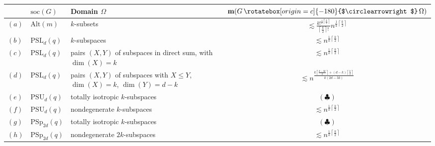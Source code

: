 \documentclass[a4paper]{amsart}
\newcommand{\m}{\mathbf{m}}
\newcommand{\act}{\,\rotatebox[origin=c]{-180}{$\circlearrowright$}\,}
\theoremstyle{definition}
\begin{document}
{\small
\begin{table}[th]
	\centering
	\begin{tabularx}{\textwidth}{l l X c}
		\toprule
		& $\mathrm{soc}(G)$ & Domain $\Omega$ & $\m(G \act \Omega)$ \\
		
		\midrule
        $(a)$ & $\mathrm{Alt}(m)$ & $k$-subsets & $\displaystyle
        \lesssim \frac{k!^{\frac{1}{k} \left\lceil \frac{k}{2}\right\rceil}}{\left\lceil \frac{k}{2}\right\rceil !} n^{\frac{1}{k} \left\lceil \frac{k}{2}\right\rceil}  $ \\
		
		$(b)$ & $\mathrm{PSL}_d(q)$ & $k$-subspaces & $\displaystyle
        \lesssim n^{\frac{1}{k} \left\lceil \frac{k}{2}\right\rceil}$  \\

        $(c)$ & $\mathrm{PSL}_d(q)$ & \shortstack{pairs $(X,Y)$ of subspaces in\\direct sum, with $\dim(X)=k$} & $\displaystyle
        \lesssim n^{\frac{1}{k} \left\lceil \frac{k}{2}\right\rceil}$ \\
        
        $(d)$ & $\mathrm{PSL}_d(q)$ & \shortstack{pairs $(X,Y)$ of subspaces with\\$X\le Y$, $\dim(X) =k$, $\dim(Y) =d-k$} & $\displaystyle
        \lesssim n^{\frac{k \left\lceil \frac{d - 3k}{2} \right\rceil + (d-k) \left\lceil \frac{k}{2} \right\rceil}{k(2d-3k)}}$  \\

        $(e)$ & $\mathrm{PSU}_d(q)$ & totally isotropic $k$-subspaces & $(\clubsuit)$ \\
        
        $(f)$ & $\mathrm{PSU}_d(q)$ & nondegenerate $k$-subspaces & $\displaystyle \lesssim n^{\frac{1}{k} \left\lceil \frac{k}{2}\right\rceil}$ \\

        $(g)$ & $\mathrm{PSp}_{2d}(q)$ & totally isotropic $k$-subspaces & $(\clubsuit)$ \\
        
        $(h)$ & $\mathrm{PSp}_{2d}(q)$ & nondegenerate $2k$-subspaces & $\displaystyle \lesssim n^{\frac{1}{k} \left\lceil \frac{k}{2}\right\rceil}$ \\
        

\end{tabularx}
\end{table}}
\end{document}

